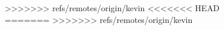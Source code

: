 \documentclass{nature}
\begin{document}
{\begin{figure}[tb]
>>>>>>> refs/remotes/origin/kevin
%
<<<<<<< HEAD
=======
>>>>>>> refs/remotes/origin/kevin
%

\end{figure}}
\end{document}
